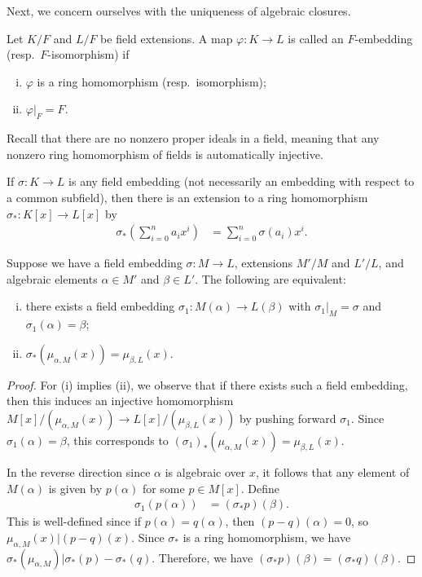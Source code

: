 \documentclass[10pt]{mypackage}
\begin{document}
Next, we concern ourselves with the uniqueness of algebraic closures.
\begin{definition}
  Let $K/F$ and $L/F$ be field extensions. A map $\varphi\colon K\rightarrow L$ is called an $F$-embedding (resp.\ $F$-isomorphism) if
  \begin{enumerate}[(i)]
    \item $\varphi$ is a ring homomorphism (resp.\ isomorphism);
    \item $\varphi|_{F} = F$.
  \end{enumerate}
\end{definition}
Recall that there are no nonzero proper ideals in a field, meaning that any nonzero ring homomorphism of fields is automatically injective.

If $\sigma\colon K\rightarrow L$ is any field embedding (not necessarily an embedding with respect to a common subfield), then there is an extension to a ring homomorphism $\sigma_{\ast}\colon K[x]\rightarrow L[x]$ by
\begin{align*}
  \sigma_{\ast} \left( \sum_{i=0}^{n}a_ix^i \right) &= \sum_{i=0}^{n} \sigma\left( a_i \right)x^i.
\end{align*}
\begin{lemma}
  Suppose we have a field embedding $\sigma\colon M\rightarrow L$, extensions $M'/M$ and $L'/L$, and algebraic elements $\alpha\in M'$ and $\beta\in L'$. The following are equivalent:
  \begin{enumerate}[(i)]
    \item there exists a field embedding $\sigma_{1}\colon M\left( \alpha \right)\rightarrow L\left( \beta \right)$ with $\sigma_1|_{M} = \sigma$ and $\sigma_1\left( \alpha \right) = \beta$;
    \item $\sigma_{\ast}\left( \mu_{\alpha,M}(x) \right) = \mu_{\beta,L}(x)$.
  \end{enumerate}
\end{lemma}
\begin{proof}
  For (i) implies (ii), we observe that if there exists such a field embedding, then this induces an injective homomorphism $M[x]/\left( \mu_{\alpha,M}(x) \right)\rightarrow L[x]/\left( \mu_{\beta,L}(x) \right)$ by pushing forward $\sigma_1$. Since $\sigma_{1}(\alpha) = \beta$, this corresponds to $\left( \sigma_{1} \right)_{\ast}\left( \mu_{\alpha,M}(x) \right) = \mu_{\beta,L}(x)$.

  In the reverse direction since $\alpha$ is algebraic over $x$, it follows that any element of $M(\alpha)$ is given by $p(\alpha)$ for some $p\in M[x]$. Define
  \begin{align*}
    \sigma_1\left( p(\alpha) \right) &= \left( \sigma_{\ast}p \right)(\beta).
  \end{align*}
  This is well-defined since if $p(\alpha) = q(\alpha)$, then $\left( p-q \right)(\alpha) = 0$, so $\mu_{\alpha,M}(x) | \left( p-q \right)(x)$. Since $\sigma_{\ast}$ is a ring homomorphism, we have $\sigma_{\ast}\left( \mu_{\alpha,M} \right) | \sigma_{\ast}(p)-\sigma_{\ast}(q)$. Therefore, we have $\left( \sigma_{\ast}p \right)(\beta) = \left( \sigma_{\ast}q \right)(\beta)$.
\end{proof}
\end{document}
